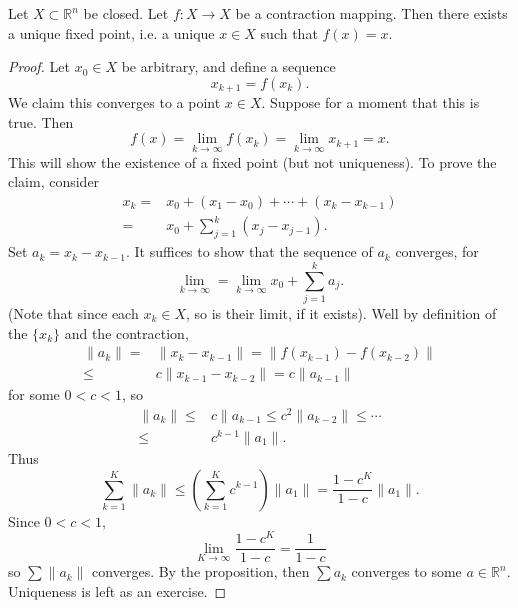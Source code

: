 \documentclass[12pt]{article}
\begin{document}
\begin{theorem}
	Let $X\subset\mathbb{R}^n$ be closed. Let $f:X\to X$ be a contraction mapping. Then there exists a unique fixed point, i.e. a unique $x\in X$ such that $f(x)=x$. 
\end{theorem}
\begin{proof} 
	Let $x_0\in X$ be arbitrary, and define a sequence 
	\begin{equation*}
		x_{k+1}=f(x_k).
	\end{equation*}
	We claim this converges to a point $x\in X$. Suppose for a moment that this is true. Then 
	\begin{equation*}
		f(x) = \lim_{k\to \infty}f(x_k) = \lim_{k\to\infty}x_{k+1}=x.
	\end{equation*}
	This will show the existence of a fixed point (but not uniqueness). To prove the claim, consider 
	\begin{align*}
		x_k 
		=& x_0 + (x_1-x_0) + \cdots + (x_k-x_{k-1}) \\
		=& x_0 + \sum_{j=1}^k (x_j-x_{j-1}).
	\end{align*}
	Set $a_k=x_k-x_{k-1}$. It suffices to show that the sequence of $a_k$ converges, for 
	\begin{equation*}
		\lim_{k\to\infty} = \lim_{k\to\infty} x_0 + \sum_{j=1}^k a_j.
	\end{equation*}
	(Note that since each $x_k\in X$, so is their limit, if it exists). Well by definition of the $\{x_k\}$ and the contraction, 
	\begin{align*}
		\|a_k\| 
		=& \|x_k-x_{k-1}\| = \|f(x_{k-1})-f(x_{k-2})\| \\
		\leq& c\|x_{k-1}-x_{k-2}\| = c\|a_{k-1}\|
	\end{align*}
	for some $0<c<1$, so 
	\begin{align*}
		\|a_k\| 
		\leq& c\|a_{k-1} \leq c^2 \|a_{k-2}\| \leq \cdots \\
		\leq& c^{k-1}\|a_1\|.
	\end{align*}
	Thus 
	\begin{equation*}
		\sum_{k=1}^K \|a_k\| \leq \left(\sum_{k=1}^K c^{k-1}\right)\|a_1\| = \frac{1-c^K}{1-c}\|a_1\|.
	\end{equation*}
	Since $0<c<1$, 
	\begin{equation*}
		\lim_{K\to\infty}\frac{1-c^K}{1-c} = \frac{1}{1-c}
	\end{equation*}
	so $\sum \|a_k\|$ converges. By the proposition, then $\sum a_k$ converges to some $a\in\mathbb{R}^n$. Uniqueness is left as an exercise.
\end{proof}	
\end{document}
